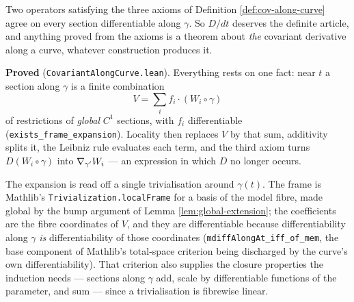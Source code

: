 \begin{lemma}[Uniqueness of $D/dt$]
  \label{lem:cov-along-curve-unique}
  \leanok
  Two operators satisfying the three axioms of Definition
  \ref{def:cov-along-curve} agree on every section differentiable along
  $\gamma$. So $D/dt$ deserves the definite article, and anything proved from
  the axioms is a theorem about \emph{the} covariant derivative along a curve,
  whatever construction produces it.

  \textbf{Proved} (\texttt{CovariantAlongCurve.lean}). Everything rests on one
  fact: near $t$ a section along $\gamma$ is a finite combination
  \[
    V = \sum_i f_i \cdot (W_i \circ \gamma)
  \]
  of restrictions of \emph{global} $C^1$ sections, with $f_i$ differentiable
  (\texttt{exists\_frame\_expansion}). Locality then replaces $V$ by that sum,
  additivity splits it, the Leibniz rule evaluates each term, and the third
  axiom turns $D(W_i \circ \gamma)$ into $\nabla_{\gamma'}W_i$ --- an expression
  in which $D$ no longer occurs.

  The expansion is read off a single trivialisation around $\gamma(t)$. The
  frame is Mathlib's \texttt{Trivialization.localFrame} for a basis of the
  model fibre, made global by the bump argument of Lemma
  \ref{lem:global-extension}; the coefficients are the fibre coordinates of
  $V$, and they are differentiable because differentiability along $\gamma$
  \emph{is} differentiability of those coordinates
  (\texttt{mdiffAlongAt\_iff\_of\_mem}, the base component of Mathlib's
  total-space criterion being discharged by the curve's own
  differentiability). That criterion also supplies the closure properties the
  induction needs --- sections along $\gamma$ add, scale by differentiable
  functions of the parameter, and sum --- since a trivialisation is fibrewise
  linear.
\end{lemma}

